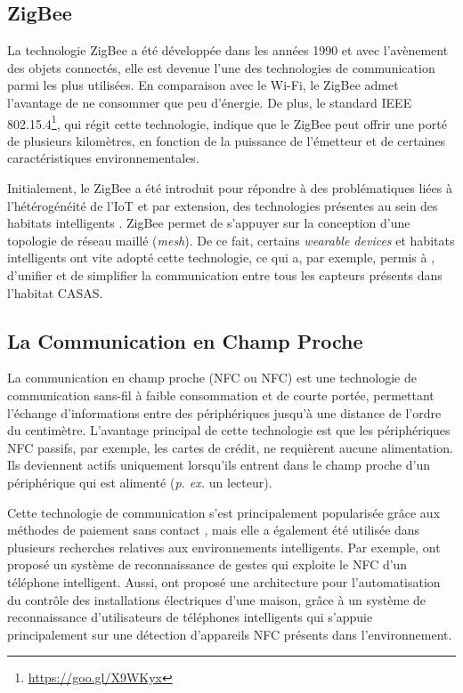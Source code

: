 \subsection{ZigBee}
\label{subec:com_zigbee}

La technologie ZigBee a été développée dans les années 1990 et avec l'avènement des objets connectés, elle est devenue l'une des technologies de communication parmi les plus utilisées. En comparaison avec le Wi-Fi, le ZigBee admet l'avantage de ne consommer que peu d'énergie. De plus, le standard IEEE 802.15.4\footnote{\url{https://goo.gl/X9WKyx}}, qui régit cette technologie, indique que le ZigBee peut offrir une porté de plusieurs kilomètres, en fonction de la puissance de l'émetteur et de certaines caractéristiques environnementales.

Initialement, le ZigBee a été introduit pour répondre à des problématiques liées à l'hétérogénéité de l'\acs{IoT} \citep{Rahmani2015, Cho2013} et par extension, des technologies présentes au sein des habitats intelligents \citep{Hui2017}. ZigBee permet de s'appuyer sur la conception d'une topologie de réseau maillé (\textit{mesh}). De ce fait, certains \textit{wearable devices} \citep{Cruz2018} et habitats intelligents \citep{Cook2013} ont vite adopté cette technologie, ce qui a, par exemple, permis à \cite{Cook2013}, d'unifier et de simplifier la communication entre tous les capteurs présents dans l'habitat CASAS.

\subsection{La Communication en Champ Proche}

La communication en champ proche (\acl{NFC} ou \acs{NFC}) est une technologie de communication sans-fil à faible consommation et de courte portée, permettant l'échange d'informations entre des périphériques jusqu'à une distance de l'ordre du centimètre. L'avantage principal de cette technologie est que les périphériques \acs{NFC} passifs, par exemple, les cartes de crédit, ne requièrent aucune alimentation. Ils deviennent actifs uniquement lorsqu'ils entrent dans le champ proche d'un périphérique qui est alimenté (\textit{p. ex.} un lecteur).

Cette technologie de communication s'est principalement popularisée grâce aux méthodes de paiement sans contact \citep{Ondrus2007}, mais elle a également été utilisée dans plusieurs recherches relatives aux environnements intelligents. Par exemple, \cite{Pering2007} ont proposé un système de reconnaissance de gestes qui exploite le \acs{NFC} d'un téléphone intelligent. Aussi, \cite{Chang2009} ont proposé une architecture pour l'automatisation du contrôle des installations électriques d'une maison, grâce à un système de reconnaissance d'utilisateurs de téléphones intelligents qui s'appuie principalement sur une détection d'appareils \acs{NFC} présents dans l'environnement.

